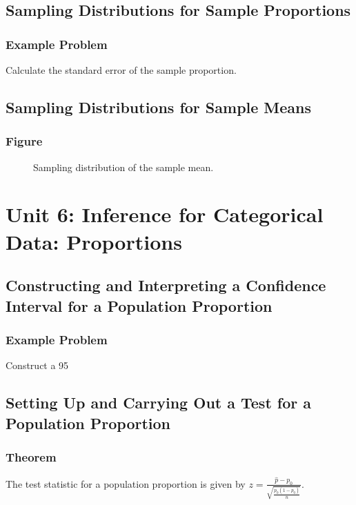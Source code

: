 \subsection{Sampling Distributions for Sample Proportions}
\subsubsection{Example Problem}
\begin{example}
Calculate the standard error of the sample proportion.
\end{example}

\subsection{Sampling Distributions for Sample Means}
\subsubsection{Figure}
\begin{figure}[h!]
\centering
\caption{Sampling distribution of the sample mean.}
\end{figure}

\section{Unit 6: Inference for Categorical Data: Proportions}
\subsection{Constructing and Interpreting a Confidence Interval for a Population Proportion}
\subsubsection{Example Problem}
\begin{example}
Construct a 95%
\end{example}

\subsection{Setting Up and Carrying Out a Test for a Population Proportion}
\subsubsection{Theorem}
\begin{theorem}
The test statistic for a population proportion is given by \( z = \frac{\hat{p} - p_0}{\sqrt{\frac{p_0(1-p_0)}{n}}} \).
\end{theorem}

